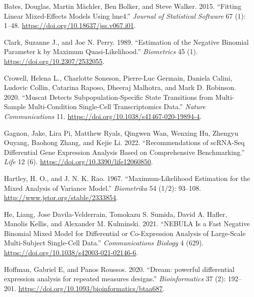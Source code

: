 \documentclass[
]{article}
\newlength{\cslhangindent}
\newlength{\cslentryspacingunit} %
\newenvironment{CSLReferences}[2] %
 {%
  \setlength{\parindent}{0pt}
  \ifodd #1
  \let\oldpar\par
  \def\par{\hangindent=\cslhangindent\oldpar}
  \fi
  \setlength{\parskip}{#2\cslentryspacingunit}
 }%
 {}
\begin{document}
\hypertarget{refs}{}
\begin{CSLReferences}{1}{0}
\leavevmode{}%
Bates, Douglas, Martin Mächler, Ben Bolker, and Steve Walker. 2015.
{``Fitting Linear Mixed-Effects Models Using {lme4}.''} \emph{Journal of
Statistical Software} 67 (1): 1--48.
\url{https://doi.org/10.18637/jss.v067.i01}.

\leavevmode{}%
Clark, Suzanne J., and Joe N. Perry. 1989. {``Estimation of the Negative
Binomial Parameter k by Maximum Quasi-Likelihood.''} \emph{Biometrics}
45 (1). \url{https://doi.org/10.2307/2532055}.

\leavevmode{}%
Crowell, Helena L., Charlotte Soneson, Pierre-Luc Germain, Daniela
Calini, Ludovic Collin, Catarina Raposo, Dheeraj Malhotra, and Mark D.
Robinson. 2020. {``Muscat Detects Subpopulation-Specific State
Transitions from Multi-Sample Multi-Condition Single-Cell
Transcriptomics Data.''} \emph{Nature Communications} 11.
\url{https://doi.org/10.1038/s41467-020-19894-4}.

\leavevmode{}%
Gagnon, Jake, Lira Pi, Matthew Ryals, Qingwen Wan, Wenxing Hu, Zhengyu
Ouyang, Baohong Zhang, and Kejie Li. 2022. {``Recommendations of
scRNA-Seq Differential Gene Expression Analysis Based on Comprehensive
Benchmarking.''} \emph{Life} 12 (6).
\url{https://doi.org/10.3390/life12060850}.

\leavevmode{}%
Hartley, H. O., and J. N. K. Rao. 1967. {``Maximum-Likelihood Estimation
for the Mixed Analysis of Variance Model.''} \emph{Biometrika} 54 (1/2):
93--108. \url{http://www.jstor.org/stable/2333854}.

\leavevmode{}%
He, Liang, Jose Davila-Velderrain, Tomokazu S. Sumida, David A. Hafler,
Manolis Kellis, and Alexander M. Kulminski. 2021. {``NEBULA Is a Fast
Negative Binomial Mixed Model for Differential or Co-Expression Analysis
of Large-Scale Multi-Subject Single-Cell Data.''} \emph{Communications
Biology} 4 (629). \url{https://doi.org/10.1038/s42003-021-02146-6}.

\leavevmode{}%
Hoffman, Gabriel E, and Panos Roussos. 2020. {``{Dream: powerful
differential expression analysis for repeated measures designs}.''}
\emph{Bioinformatics} 37 (2): 192--201.
\url{https://doi.org/10.1093/bioinformatics/btaa687}.


\end{CSLReferences}
\end{document}
